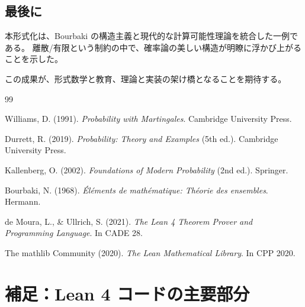 \documentclass[a4paper,12pt]{ltjsarticle}
\theoremstyle{definition}
\begin{document}
\subsection{最後に}

本形式化は、Bourbaki の構造主義と現代的な計算可能性理論を統合した一例である。
離散/有限という制約の中で、確率論の美しい構造が明瞭に浮かび上がることを示した。

この成果が、形式数学と教育、理論と実装の架け橋となることを期待する。

\vspace{1em}

\begin{center}
\end{center}

\begin{thebibliography}{99}

Williams, D. (1991).
\textit{Probability with Martingales}.
Cambridge University Press.

Durrett, R. (2019).
\textit{Probability: Theory and Examples} (5th ed.).
Cambridge University Press.

Kallenberg, O. (2002).
\textit{Foundations of Modern Probability} (2nd ed.).
Springer.

Bourbaki, N. (1968).
\textit{Éléments de mathématique: Théorie des ensembles}.
Hermann.

de Moura, L., \& Ullrich, S. (2021).
\textit{The Lean 4 Theorem Prover and Programming Language}.
In CADE 28.

The mathlib Community (2020).
\textit{The Lean Mathematical Library}.
In CPP 2020.

\end{thebibliography}

\appendix

\section{補足：Lean 4 コードの主要部分}
\end{document}
